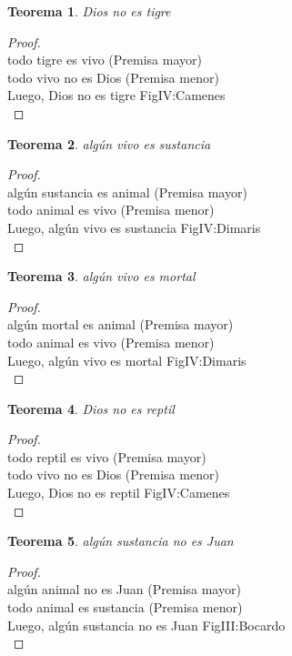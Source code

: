 ﻿\documentclass[12pt]{book}
\newtheorem{theorem}{Teorema}[chapter]
\newtheorem{proof}{Demostración}
\begin{document}
\begin{theorem}
Dios no es tigre
\label{th: 77}
\end{theorem}\begin{proof}\\todo tigre es vivo	 (Premisa mayor) \\todo vivo no es Dios	 (Premisa menor) \\Luego, Dios no es tigre	FigIV:Camenes \\ \end{proof}
\begin{theorem}
algún vivo es sustancia
\label{th: 78}
\end{theorem}\begin{proof}\\algún sustancia es animal	 (Premisa mayor) \\todo animal es vivo	 (Premisa menor) \\Luego, algún vivo es sustancia	FigIV:Dimaris \\ \end{proof}
\begin{theorem}
algún vivo es mortal
\label{th: 79}
\end{theorem}\begin{proof}\\algún mortal es animal	 (Premisa mayor) \\todo animal es vivo	 (Premisa menor) \\Luego, algún vivo es mortal	FigIV:Dimaris \\ \end{proof}
\begin{theorem}
Dios no es reptil
\label{th: 80}
\end{theorem}\begin{proof}\\todo reptil es vivo	 (Premisa mayor) \\todo vivo no es Dios	 (Premisa menor) \\Luego, Dios no es reptil	FigIV:Camenes \\ \end{proof}
\begin{theorem}
algún sustancia no es Juan
\label{th: 81}
\end{theorem}\begin{proof}\\algún animal no es Juan	 (Premisa mayor) \\todo animal es sustancia	 (Premisa menor) \\Luego, algún sustancia no es Juan	FigIII:Bocardo \\ \end{proof}
\end{document}
